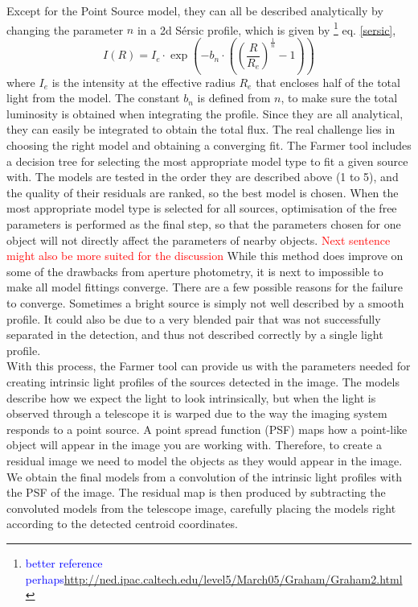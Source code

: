 Except for the Point Source model, they can all be described analytically by changing the parameter $n$ in a 2d Sérsic profile, which is given by \footnote{\textcolor{blue}{better reference perhaps}\url{http://ned.ipac.caltech.edu/level5/March05/Graham/Graham2.html}} eq. \ref{sersic},
\begin{equation}
   I(R) = I_e \cdot \exp \left(-b_n \cdot \left( \left( \frac{R}{R_e} \right)^{\frac{1}{n}} - 1\right) \right)
   \label{sersic}
\end{equation}
where $I_e$ is the intensity at the effective radius $R_e$ that encloses half of the total light from the model. The constant $b_n$ is defined from $n$, to make sure the total luminosity is obtained when integrating the profile. Since they are all analytical, they can easily be integrated to obtain the total flux. The real challenge lies in choosing the right model and obtaining a converging fit. The Farmer tool includes a decision tree for selecting the most appropriate model type to fit a given source with. The models are tested in the order they are described above (1 to 5), and the quality of their residuals are ranked, so the best model is chosen. When the most appropriate model type is selected for all sources, optimisation of the free parameters is performed as the final step, so that the parameters chosen for one object will not directly affect the parameters of nearby objects. \textcolor{red}{Next sentence might also be more suited for the discussion} While this method does improve on some of the drawbacks from aperture photometry, it is next to impossible to make all model fittings converge. There are a few possible reasons for the failure to converge. Sometimes a bright source is simply not well described by a smooth profile. It could also be due to a very blended pair that was not successfully separated in the detection, and thus not described correctly by a single light profile. \\
With this process, the Farmer tool can provide us with the parameters needed for creating intrinsic light profiles of the sources detected in the image. The models describe how we expect the light to look intrinsically, but when the light is observed through a telescope it is warped due to the way the imaging system responds to a point source. A point spread function (PSF) maps how a point-like object will appear in the image you are working with. Therefore, to create a residual image we need to model the objects as they would appear in the image. We obtain the final models from a convolution of the intrinsic light profiles with the PSF of the image. The residual map is then produced by subtracting the convoluted models from the telescope image, carefully placing the models right according to the detected centroid coordinates.

